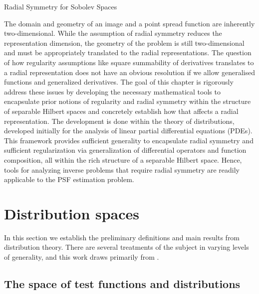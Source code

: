\setlength{\parindent}{2ex}
\begin{chapter}{Radial Symmetry for Sobolev Spaces}\label{chapter:theoretical}

The domain and geometry of an image and a point spread function are inherently two-dimensional. 
While the assumption of radial symmetry reduces the representation dimension, the geometry of the problem is still two-dimensional and must be appropriately translated to the radial representations. 
The question of how regularity assumptions like square summability of derivatives translates to a radial representation does not have an obvious resolution if we allow generalised functions and generalized derivatives.
The goal of this chapter is rigorously address these issues by developing the necessary mathematical tools to encapsulate prior notions of regularity and radial symmetry within the structure of separable Hilbert spaces and concretely establish how that affects a radial representation.
The development is done within the theory of distributions, developed initially for the analysis of linear partial differential equations (PDEs). 
This framework provides sufficient generality to encapsulate radial symmetry and sufficient regularization via generalization of differential operators and function composition, all within the rich structure of a separable Hilbert space.
Hence, tools for analyzing inverse problems that require radial symmetry are readily applicable to the PSF estimation problem.

\section{Distribution spaces}
In this section we establish the preliminary definitions and main results from distribution theory.
There are several treatments of the subject in varying levels of generality, and this work draws primarily from \citep{richtmyer1978principles,hormander1983,rudin1991,griffel2002,strichartz2003guide}.

  \subsection{The space of test functions and distributions}


\end{chapter}

